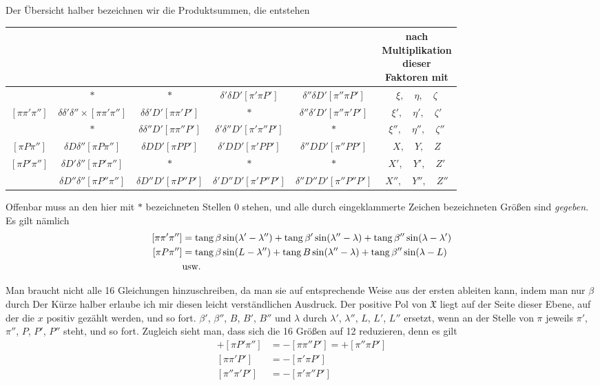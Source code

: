 Der Übersicht halber bezeichnen wir die Produktsummen, die entstehen
\begin{center}\begingroup\fontsize{9}{11}\selectfont\setlength{\tabcolsep}{.8pt}
\begin{tabular}{c|c|c|c|c|c}
&&&&&\shortstack{nach\\Multiplikation\\dieser\\Faktoren mit}\\\hline
&$*$&$*$&$\delta'\delta D'[\pi'\pi P']$&$\delta''\delta D'[\pi''\pi P']$&$\xi,\quad\eta,\quad\zeta$\\
$[\pi\pi'\pi'']$&$\delta\delta'\delta''\times[\pi\pi'\pi'']$&$\delta\delta'D'[\pi\pi'P']$&$*$&$\delta''\delta'D'[\pi''\pi'P']$&$\xi',\quad\eta',\quad\zeta'$\\
&$*$&$\delta\delta''D'[\pi\pi''P']$&$\delta'\delta''D'[\pi'\pi''P']$&$*$&$\xi'',\quad\eta'',\quad\zeta''$\\
$[\pi P\pi'']$&$\delta D\delta''[\pi P\pi'']$&$\delta DD'[\pi PP']$&$\delta'DD'[\pi'PP']$&$\delta''DD'[\pi''PP']$&$X,\quad Y,\quad Z$\\
$[\pi P'\pi'']$&$\delta D'\delta''[\pi P'\pi'']$&$*$&$*$&$*$&$X',\quad Y',\quad Z'$\\
&$\delta D''\delta''[\pi P''\pi'']$&$\delta D''D'[\pi P''P']$&$\delta'D''D'[\pi'P''P']$&$\delta''D''D'[\pi''P''P']$&$X'',\quad Y'',\quad Z''$
\end{tabular}\endgroup\end{center}
Offenbar muss an den hier mit $*$ bezeichneten Stellen $0$ stehen, und alle durch eingeklammerte Zeichen bezeichneten Größen sind \emph{gegeben}. Es gilt nämlich
\[
\begin{aligned}\relax
[\pi\pi'\pi'']&=\operatorname{tang}\beta\sin(\lambda'-\lambda'')+\operatorname{tang}\beta'\sin(\lambda''-\lambda)+\operatorname{tang}\beta''\sin(\lambda-\lambda')\\
[\pi P\pi'']&=\operatorname{tang}\beta\sin(L-\lambda'')+\operatorname{tang}B\sin(\lambda''-\lambda)+\operatorname{tang}\beta''\sin(\lambda-L)\\
&\text{usw.}
\end{aligned}
\]

Man braucht nicht alle 16 Gleichungen hinzuschreiben, da man sie auf entsprechende Weise aus der ersten ableiten kann, indem man nur $\beta$ durch
\expandafter\def\csname HistoricalNoteText9\endcsname{Der Kürze halber erlaube ich mir diesen leicht verständlichen Ausdruck. Der positive Pol von $\mathfrak{X}$ liegt auf der Seite dieser Ebene, auf der die $x$ positiv gezählt werden, und so fort.}%
%
$\beta'$, $\beta''$, $B$, $B'$, $B''$ und $\lambda$ durch $\lambda'$, $\lambda''$, $L$, $L'$, $L''$ ersetzt, wenn an der Stelle von $\pi$ jeweils $\pi'$, $\pi''$, $P$, $P'$, $P''$ steht, und so fort. Zugleich sieht man, dass sich die 16 Größen auf 12 reduzieren, denn es gilt
\[
\begin{aligned}
+[\pi P'\pi'']&=-[\pi\pi''P']=+[\pi''\pi P']\\
[\pi\pi'P']&=-[\pi'\pi P']\\
[\pi''\pi'P']&=-[\pi'\pi''P']
\end{aligned}
\]

